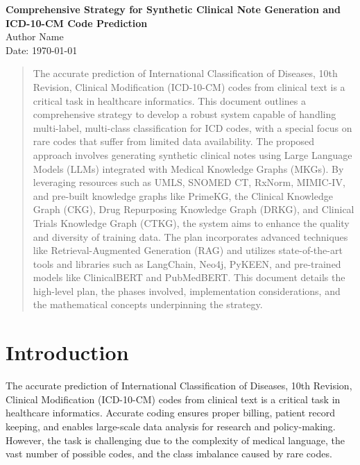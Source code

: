 \documentclass[12pt, a4paper]{article}
\begin{document}
\begin{center}
    \Large{\textbf{Comprehensive Strategy for Synthetic Clinical Note Generation and ICD-10-CM Code Prediction}}\\[1cm]
    \large{Author Name}\\
    \large{Date: \today}
\end{center}

\vspace{1cm}

\begin{abstract}
The accurate prediction of International Classification of Diseases, 10th Revision, Clinical Modification (ICD-10-CM) codes from clinical text is a critical task in healthcare informatics. This document outlines a comprehensive strategy to develop a robust system capable of handling multi-label, multi-class classification for ICD codes, with a special focus on rare codes that suffer from limited data availability. The proposed approach involves generating synthetic clinical notes using Large Language Models (LLMs) integrated with Medical Knowledge Graphs (MKGs). By leveraging resources such as UMLS, SNOMED CT, RxNorm, MIMIC-IV, and pre-built knowledge graphs like PrimeKG, the Clinical Knowledge Graph (CKG), Drug Repurposing Knowledge Graph (DRKG), and Clinical Trials Knowledge Graph (CTKG), the system aims to enhance the quality and diversity of training data. The plan incorporates advanced techniques like Retrieval-Augmented Generation (RAG) and utilizes state-of-the-art tools and libraries such as LangChain, Neo4j, PyKEEN, and pre-trained models like ClinicalBERT and PubMedBERT. This document details the high-level plan, the phases involved, implementation considerations, and the mathematical concepts underpinning the strategy.
\end{abstract}

\tableofcontents
\newpage

\section{Introduction}

The accurate prediction of International Classification of Diseases, 10th Revision, Clinical Modification (ICD-10-CM) codes from clinical text is a critical task in healthcare informatics. Accurate coding ensures proper billing, patient record keeping, and enables large-scale data analysis for research and policy-making. However, the task is challenging due to the complexity of medical language, the vast number of possible codes, and the class imbalance caused by rare codes.
\end{document}
